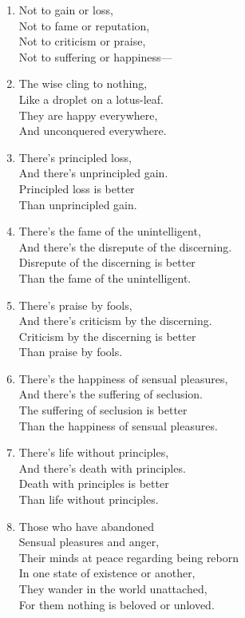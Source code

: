 \documentclass[10pt, openany]{book}
\begin{document}
\begin{enumerate}
\item Not to gain or loss,\\
Not to fame or reputation,\\
Not to criticism or praise,\\
Not to suffering or happiness—

\item The wise cling to nothing,\\
Like a droplet on a lotus-leaf.\\
They are happy everywhere,\\
And unconquered everywhere.

\item There’s principled loss,\\
And there’s unprincipled gain.\\
Principled loss is better\\
Than unprincipled gain.

\item There’s the fame of the unintelligent,\\
And there’s the disrepute of the discerning.\\
Disrepute of the discerning is better\\
Than the fame of the unintelligent.

\item There’s praise by fools,\\
And there’s criticism by the discerning.\\
Criticism by the discerning is better\\
Than praise by fools.

\item There’s the happiness of sensual pleasures,\\
And there’s the suffering of seclusion.\\
The suffering of seclusion is better\\
Than the happiness of sensual pleasures.

\item There’s life without principles,\\
And there’s death with principles.\\
Death with principles is better\\
Than life without principles.

\item Those who have abandoned \\
Sensual pleasures and anger,\\
Their minds at peace regarding being reborn \\
In one state of existence or another,\\
They wander in the world unattached,\\
For them nothing is beloved or unloved.


\end{enumerate}
\end{document}
